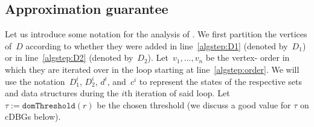 \subsection{Approximation guarantee}\label{app:threshold}

Let us introduce some notation for the analysis of
. We first partition the vertices of~$D$ according
to whether they were added in line~\ref{algstep:D1} (denoted by~$D_1$) or in
line~\ref{algstep:D2} (denoted by~$D_2$). Let~$v_1,\ldots,v_n$ be the vertex-
order in which they are iterated over in the loop starting at
line~\ref{algstep:order}. We will use the notation~$D_1^i$, $D_2^i$, $d^i$,
and~$c^i$ to represent the states of the respective sets and data structures
during the $i$th iteration of said loop. Let~$\tau :=
\texttt{domThreshold}(r)$ be the chosen threshold (we discuss a good value
for $\tau$ on cDBGs below).

